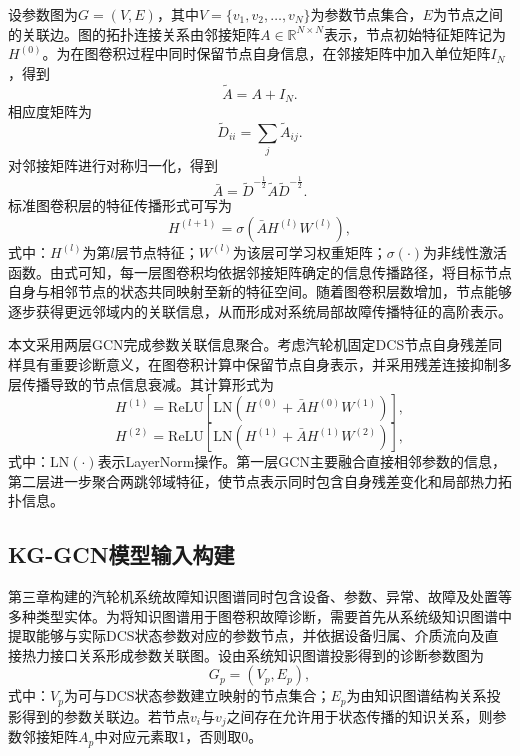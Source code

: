设参数图为$G=(V,E)$，其中$V=\{v_1,v_2,\ldots,v_N\}$为参数节点集合，$E$为节点之间的关联边。图的拓扑连接关系由邻接矩阵$A\in\mathbb{R}^{N\times N}$表示，节点初始特征矩阵记为$H^{(0)}$。为在图卷积过程中同时保留节点自身信息，在邻接矩阵中加入单位矩阵$I_N$，得到
\begin{equation}
\tilde A=A+I_N.
\end{equation}
相应度矩阵为
\begin{equation}
\tilde D_{ii}=\sum_j\tilde A_{ij}.
\end{equation}
对邻接矩阵进行对称归一化，得到
\begin{equation}
\bar A=\tilde D^{-\frac{1}{2}}\tilde A\tilde D^{-\frac{1}{2}}.
\end{equation}
标准图卷积层的特征传播形式可写为
\begin{equation}
H^{(l+1)}=\sigma\left(\bar A H^{(l)}W^{(l)}\right),
\end{equation}
式中：$H^{(l)}$为第$l$层节点特征；$W^{(l)}$为该层可学习权重矩阵；$\sigma(\cdot)$为非线性激活函数。由式可知，每一层图卷积均依据邻接矩阵确定的信息传播路径，将目标节点自身与相邻节点的状态共同映射至新的特征空间。随着图卷积层数增加，节点能够逐步获得更远邻域内的关联信息，从而形成对系统局部故障传播特征的高阶表示。

本文采用两层GCN完成参数关联信息聚合。考虑汽轮机固定DCS节点自身残差同样具有重要诊断意义，在图卷积计算中保留节点自身表示，并采用残差连接抑制多层传播导致的节点信息衰减。其计算形式为
\begin{equation}
H^{(1)}=\mathrm{ReLU}\left[\mathrm{LN}\left(H^{(0)}+\bar A H^{(0)}W^{(1)}\right)\right],
\end{equation}
\begin{equation}
H^{(2)}=\mathrm{ReLU}\left[\mathrm{LN}\left(H^{(1)}+\bar A H^{(1)}W^{(2)}\right)\right],
\end{equation}
式中：$\mathrm{LN}(\cdot)$表示LayerNorm操作。第一层GCN主要融合直接相邻参数的信息，第二层进一步聚合两跳邻域特征，使节点表示同时包含自身残差变化和局部热力拓扑信息。

\subsection{KG-GCN模型输入构建}
\label{subsec:kg_input_v4}

第三章构建的汽轮机系统故障知识图谱同时包含设备、参数、异常、故障及处置等多种类型实体。为将知识图谱用于图卷积故障诊断，需要首先从系统级知识图谱中提取能够与实际DCS状态参数对应的参数节点，并依据设备归属、介质流向及直接热力接口关系形成参数关联图。设由系统知识图谱投影得到的诊断参数图为
\begin{equation}
G_p=(V_p,E_p),
\end{equation}
式中：$V_p$为可与DCS状态参数建立映射的节点集合；$E_p$为由知识图谱结构关系投影得到的参数关联边。若节点$v_i$与$v_j$之间存在允许用于状态传播的知识关系，则参数邻接矩阵$A_p$中对应元素取1，否则取0。

